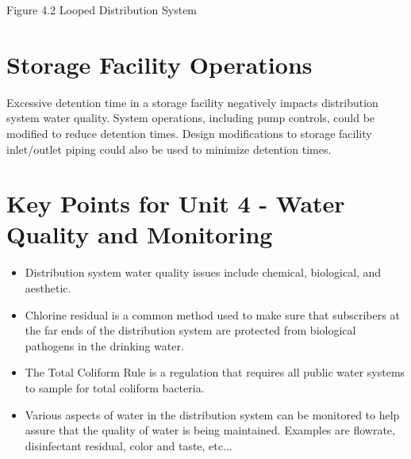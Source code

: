 \documentclass[10pt]{article}
\begin{document}
Figure 4.2 Looped Distribution System

\section{Storage Facility Operations}
Excessive detention time in a storage facility negatively impacts distribution system water quality. System operations, including pump controls, could be modified to reduce detention times. Design modifications to storage facility inlet/outlet piping could also be used to minimize detention times.

\section{Key Points for Unit 4 - Water Quality and Monitoring}
\begin{itemize}
  \item Distribution system water quality issues include chemical, biological, and aesthetic.

  \item Chlorine residual is a common method used to make sure that subscribers at the far ends of the distribution system are protected from biological pathogens in the drinking water.

  \item The Total Coliform Rule is a regulation that requires all public water systems to sample for total coliform bacteria.

  \item Various aspects of water in the distribution system can be monitored to help assure that the quality of water is being maintained. Examples are flowrate, disinfectant residual, color and taste, etc...

\end{itemize}
\end{document}
